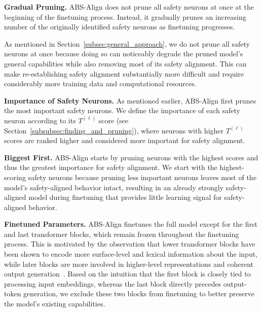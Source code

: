 \textbf{Gradual Pruning.} ABS-Align does not prune all safety neurons at once at the beginning of the finetuning process. Instead, it gradually prunes an increasing number of the originally identified safety neurons as finetuning progresses.

As mentioned in Section~\ref{subsec:general_approach}, we do not prune all safety neurons at once because doing so can noticeably degrade the pruned model's general capabilities while also removing most of its safety alignment. This can make re-establishing safety alignment substantially more difficult and require considerably more training data and computational resources.

\textbf{Importance of Safety Neurons.} As mentioned earlier, ABS-Align first prunes the most important safety neurons. We define the importance of each safety neuron according to its $T^{(\ell)}$ score (see Section~\ref{subsubsec:finding_and_pruning}), where neurons with higher $T^{(\ell)}$ scores are ranked higher and considered more important for safety alignment.

\textbf{Biggest First.} ABS-Align starts by pruning neurons with the highest scores and thus the greatest importance for safety alignment. We start with the highest-scoring safety neurons because pruning less important neurons leaves most of the model's safety-aligned behavior intact, resulting in an already strongly safety-aligned model during finetuning that provides little learning signal for safety-aligned behavior.

\textbf{Finetuned Parameters.} ABS-Align finetunes the full model except for the first and last transformer blocks, which remain frozen throughout the finetuning process. This is motivated by the observation that lower transformer blocks have been shown to encode more surface-level and lexical information about the input, while later blocks are more involved in higher-level representations and coherent output generation~\cite{meaning2026}. Based on the intuition that the first block is closely tied to processing input embeddings, whereas the last block directly precedes output-token generation, we exclude these two blocks from finetuning to better preserve the model's existing capabilities.